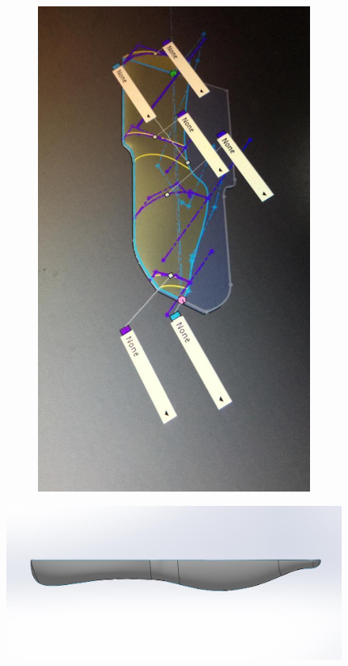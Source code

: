 \begin{figure}
\begin{subfigure}[m]{.4\linewidth}
        \includegraphics[width=\textwidth]{assets/conception1/img174.jpg}
    \end{subfigure}
\end{figure}

\FloatBarrier

\begin{figure}[!htbp]
    \centering
    \includegraphics[width=\linewidth]{assets/conception1/img179.jpg}
\end{figure}

